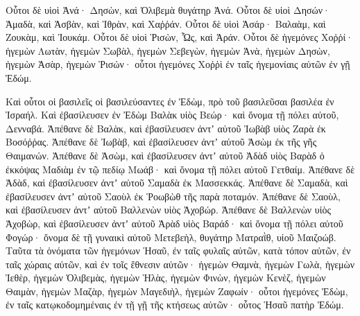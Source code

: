 {Οὗτοι δὲ υἱοὶ Ἀνά· Δησὼν, καὶ Ὀλιβεμὰ θυγάτηρ Ἀνά.
Οὗτοι δὲ υἱοὶ Δησών· Ἀμαδὰ, καὶ Ἀσβὰν, καὶ Ἰθρὰν, καὶ Χαῤῥάν.
Οὗτοι δὲ υἱοὶ Ἀσάρ· Βαλαὰμ, καὶ Ζουκὰμ, καὶ Ἰουκάμ.
Οὗτοι δὲ υἱοὶ Ῥισὼν, Ὧς, καὶ Ἀράν.
Οὗτοι δὲ ἡγεμόνες Χοῤῥί· ἡγεμὼν Λωτὰν, ἡγεμὼν Σωβὰλ, ἡγεμὼν Σεβεγὼν, ἡγεμὼν Ἀνὰ,
ἡγεμὼν Δησὼν, ἡγεμὼν Ἀσὰρ, ἡγεμὼν Ῥισών· οὗτοι ἡγεμόνες Χοῤῥὶ ἐν ταῖς ἡγεμονίαις αὐτῶν ἐν γῇ Ἐδώμ.
\par }{\PP {}Καὶ οὗτοι οἱ βασιλεῖς οἱ βασιλεύσαντες ἐν Ἐδὼμ, πρὸ τοῦ βασιλεῦσαι βασιλέα ἐν Ἰσραήλ.
Καὶ ἐβασίλευσεν ἐν Ἐδὼμ Βαλὰκ υἱὸς Βεώρ· καὶ ὄνομα τῇ πόλει αὐτοῦ, Δενναβά.
Ἀπέθανε δὲ Βαλὰκ, καὶ ἐβασίλευσεν ἀντʼ αὐτοῦ Ἰωβὰβ υἱὸς Ζαρὰ ἐκ Βοσόῤῥας.
Ἀπέθανε δὲ Ἰωβὰβ, καὶ ἐβασίλευσεν ἀντʼ αὐτοῦ Ἀσὼμ ἐκ τῆς γῆς Θαιμανών.
Ἀπέθανε δὲ Ἀσὼμ, καὶ ἐβασίλευσεν ἀντʼ αὐτοῦ Ἀδὰδ υἱὸς Βαρὰδ ὁ ἐκκόψας Μαδιὰμ ἐν τῷ πεδίῳ Μωάβ· καὶ ὄνομα τῇ πόλει αὐτοῦ Γετθαίμ.
Ἀπέθανε δὲ Ἀδὰδ, καὶ ἐβασίλευσεν ἀντʼ αὐτοῦ Σαμαδὰ ἐκ Μασσεκκάς.
Ἀπέθανε δὲ Σαμαδὰ, καὶ ἐβασίλευσεν ἀντʼ αὐτοῦ Σαοὺλ ἐκ Ῥοωβὼθ τῆς παρὰ ποταμόν.
Ἀπέθανε δὲ Σαοὺλ, καὶ ἐβασίλευσεν ἀντʼ αὐτοῦ Βαλλενὼν υἱὸς Ἀχοβώρ.
Ἀπέθανε δὲ Βαλλενὼν υἱὸς Ἀχοβὼρ, καὶ ἐβασίλευσεν ἀντʼ αὐτοῦ Ἀρὰδ υἱὸς Βαράδ· καὶ ὄνομα τῇ πόλει αὐτοῦ Φογώρ· ὄνομα δὲ τῇ γυναικὶ αὐτοῦ Μετεβεὴλ, θυγάτηρ Ματραῒθ, υἱοῦ Μαιζοώβ.
Ταῦτα τὰ ὀνόματα τῶν ἡγεμόνων Ἡσαῦ, ἐν ταῖς φυλαῖς αὐτῶν, κατὰ τόπον αὐτῶν, ἐν ταῖς χώραις αὐτῶν, καὶ ἐν τοῖς ἔθνεσιν αὐτῶν· ἡγεμὼν Θαμνὰ, ἡγεμὼν Γωλὰ, ἡγεμὼν Ἰεθὲρ,
ἡγεμὼν Ὁλιβεμὰς, ἡγεμὼν Ἡλὰς, ἡγεμὼν Φινὼν,
ἡγεμὼν Κενὲζ, ἡγεμὼν Θαιμὰν, ἡγεμὼν Μαζὰρ,
ἡγεμὼν Μαγεδιὴλ, ἡγεμὼν Ζαφωίν· οὗτοι ἡγεμόνες Ἐδὼμ, ἐν ταῖς κατῳκοδομημέναις ἐν τῇ γῇ τῆς κτήσεως αὐτῶν· οὗτος Ἡσαῦ πατὴρ Ἐδώμ.

}
